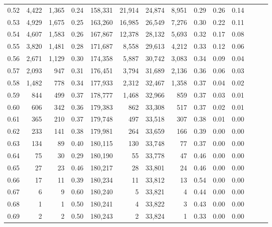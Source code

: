 \begin{tabular}{rrrrrrrrrrrrrr}
0.52 &   4,422 &  1,365 &  0.24 &  158,331 &   21,914 &  24,874 &   8,951 &  0.29 &  0.26 &      0.14 \\
0.53 &   4,929 &  1,675 &  0.25 &  163,260 &   16,985 &  26,549 &   7,276 &  0.30 &  0.22 &      0.11 \\
0.54 &   4,607 &  1,583 &  0.26 &  167,867 &   12,378 &  28,132 &   5,693 &  0.32 &  0.17 &      0.08 \\
0.55 &   3,820 &  1,481 &  0.28 &  171,687 &    8,558 &  29,613 &   4,212 &  0.33 &  0.12 &      0.06 \\
0.56 &   2,671 &  1,129 &  0.30 &  174,358 &    5,887 &  30,742 &   3,083 &  0.34 &  0.09 &      0.04 \\
0.57 &   2,093 &    947 &  0.31 &  176,451 &    3,794 &  31,689 &   2,136 &  0.36 &  0.06 &      0.03 \\
0.58 &   1,482 &    778 &  0.34 &  177,933 &    2,312 &  32,467 &   1,358 &  0.37 &  0.04 &      0.02 \\
0.59 &     844 &    499 &  0.37 &  178,777 &    1,468 &  32,966 &     859 &  0.37 &  0.03 &      0.01 \\
0.60 &     606 &    342 &  0.36 &  179,383 &      862 &  33,308 &     517 &  0.37 &  0.02 &      0.01 \\
0.61 &     365 &    210 &  0.37 &  179,748 &      497 &  33,518 &     307 &  0.38 &  0.01 &      0.00 \\
0.62 &     233 &    141 &  0.38 &  179,981 &      264 &  33,659 &     166 &  0.39 &  0.00 &      0.00 \\
0.63 &     134 &     89 &  0.40 &  180,115 &      130 &  33,748 &      77 &  0.37 &  0.00 &      0.00 \\
0.64 &      75 &     30 &  0.29 &  180,190 &       55 &  33,778 &      47 &  0.46 &  0.00 &      0.00 \\
0.65 &      27 &     23 &  0.46 &  180,217 &       28 &  33,801 &      24 &  0.46 &  0.00 &      0.00 \\
0.66 &      17 &     11 &  0.39 &  180,234 &       11 &  33,812 &      13 &  0.54 &  0.00 &      0.00 \\
0.67 &       6 &      9 &  0.60 &  180,240 &        5 &  33,821 &       4 &  0.44 &  0.00 &      0.00 \\
0.68 &       1 &      1 &  0.50 &  180,241 &        4 &  33,822 &       3 &  0.43 &  0.00 &      0.00 \\
0.69 &       2 &      2 &  0.50 &  180,243 &        2 &  33,824 &       1 &  0.33 &  0.00 &      0.00 \\

\end{tabular}
